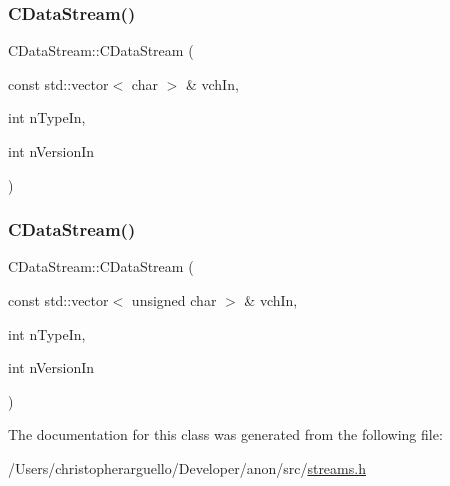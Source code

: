 \subsubsection{\texorpdfstring{C\+Data\+Stream()}{CDataStream()}\hspace{0.1cm}{\footnotesize\ttfamily [5/6]}}
{\footnotesize\ttfamily C\+Data\+Stream\+::\+C\+Data\+Stream (\begin{DoxyParamCaption}\item[{const std\+::vector$<$ char $>$ \&}]{vch\+In,  }\item[{int}]{n\+Type\+In,  }\item[{int}]{n\+Version\+In }\end{DoxyParamCaption})\hspace{0.3cm}{\ttfamily [inline]}}

\mbox{\label{class_c_data_stream_ac63bd3d0ecce0edc2aa66cc80b633b6f}} 
\subsubsection{\texorpdfstring{C\+Data\+Stream()}{CDataStream()}\hspace{0.1cm}{\footnotesize\ttfamily [6/6]}}
{\footnotesize\ttfamily C\+Data\+Stream\+::\+C\+Data\+Stream (\begin{DoxyParamCaption}\item[{const std\+::vector$<$ unsigned char $>$ \&}]{vch\+In,  }\item[{int}]{n\+Type\+In,  }\item[{int}]{n\+Version\+In }\end{DoxyParamCaption})\hspace{0.3cm}{\ttfamily [inline]}}



The documentation for this class was generated from the following file\+:\begin{DoxyCompactItemize}
\item 
/\+Users/christopherarguello/\+Developer/anon/src/\mbox{\hyperlink{streams_8h}{streams.\+h}}\end{DoxyCompactItemize}
